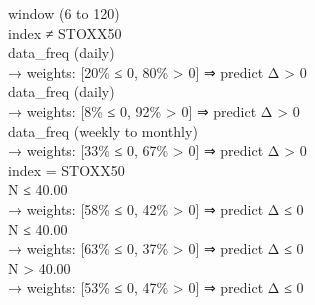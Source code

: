\begin{flushleft}
\quad window (6 to 120) \\
\quad \quad index ≠ STOXX50 \\
\quad \quad \quad data\_freq (daily) \\
\quad \quad \quad \quad → weights: [20\% ≤ 0, 80\% > 0] ⇒ predict Δ > 0 \\
\quad \quad \quad data\_freq (daily) \\
\quad \quad \quad \quad → weights: [8\% ≤ 0, 92\% > 0] ⇒ predict Δ > 0 \\
\quad \quad \quad data\_freq (weekly to monthly) \\
\quad \quad \quad \quad → weights: [33\% ≤ 0, 67\% > 0] ⇒ predict Δ > 0 \\
\quad \quad index = STOXX50 \\
\quad \quad \quad N ≤ 40.00 \\
\quad \quad \quad \quad → weights: [58\% ≤ 0, 42\% > 0] ⇒ predict Δ ≤ 0 \\
\quad \quad \quad N ≤ 40.00 \\
\quad \quad \quad \quad → weights: [63\% ≤ 0, 37\% > 0] ⇒ predict Δ ≤ 0 \\
\quad \quad \quad N > 40.00 \\
\quad \quad \quad \quad → weights: [53\% ≤ 0, 47\% > 0] ⇒ predict Δ ≤ 0 \\
\end{flushleft}

